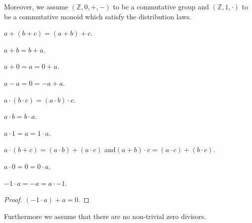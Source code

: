\documentclass{article}
\newcommand{\Int}{\mathbb{Z}}
\begin{document}
  Moreover, we assume $(\Int, 0, +, -)$ to be a commutative group and $(\Int, 1, \cdot)$ to be a commutative monoid which satisfy the distribution laws.

  \begin{forthel}
    \begin{axiom}[AddAsso]
      $a + (b + c) = (a + b) + c$.
    \end{axiom}

    \begin{axiom}[AddComm]
      $a + b = b + a$.
    \end{axiom}

    \begin{axiom}[AddZero]
      $a + 0 = a = 0 + a$.
    \end{axiom}

    \begin{axiom}[AddNeg]
      $a - a = 0 = -a + a$.
    \end{axiom}

    \begin{axiom}[MulAsso]
      $a \cdot (b \cdot c) = (a \cdot b) \cdot c$.
    \end{axiom}

    \begin{axiom}[MulComm]
      $a \cdot b = b \cdot a$.
    \end{axiom}

    \begin{axiom}[MulOne]
      $a \cdot 1 = a = 1 \cdot a$.
    \end{axiom}

    \begin{axiom}[Distrib]
      $a \cdot (b + c) = (a \cdot b) + (a \cdot c)$ and$ (a + b) \cdot c = (a \cdot c) + (b \cdot c)$.
    \end{axiom}

    \begin{lemma}[MulZero]
      $a \cdot 0 = 0 = 0 \cdot a$.
    \end{lemma}

    \begin{lemma}[MulMinOne]
      $-1 \cdot a = -a = a \cdot -1$.
    \end{lemma}
    \begin{proof}
      $(-1 \cdot a) + a = 0$.
    \end{proof}
  \end{forthel}

  Furthermore we assume that there are no non-trivial zero divisors.
\end{document}
